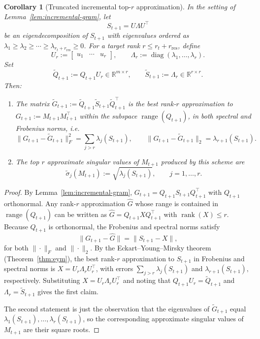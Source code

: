 \documentclass[10pt]{article} %
\newtheorem{corollary}{Corollary}
\begin{document}
\begin{corollary}[Truncated incremental top-$r$ approximation]
\label{cor:incremental-truncated}
In the setting of Lemma~\ref{lem:incremental-gram}, let
\[
  S_{t+1} = U \Lambda U^\top
\]
be an eigendecomposition of $S_{t+1}$ with eigenvalues ordered as
$\lambda_1\ge\lambda_2\ge\cdots\ge\lambda_{r_t + r_{\mathrm{res}}}\ge 0$.
For a target rank $r\le r_t + r_{\mathrm{res}}$, define
\[
  U_r := \begin{bmatrix}u_1 & \cdots & u_r\end{bmatrix},
  \qquad
  \Lambda_r := \operatorname{diag}(\lambda_1,\dots,\lambda_r).
\]
Set
\[
  \widetilde{Q}_{t+1} := Q_{t+1} U_r \in \mathbb{R}^{m\times r},
  \qquad
  \widetilde{S}_{t+1} := \Lambda_r \in \mathbb{R}^{r\times r}.
\]
Then:

\begin{enumerate}
  \item The matrix
  \(
    \widetilde{G}_{t+1} := \widetilde{Q}_{t+1} \widetilde{S}_{t+1} \widetilde{Q}_{t+1}^\top
  \)
  is the best rank-$r$ approximation to
  $G_{t+1} := M_{t+1}M_{t+1}^\top$ within the subspace
  $\operatorname{range}(Q_{t+1})$, in both spectral and Frobenius norms, i.e.
  \[
    \| G_{t+1} - \widetilde{G}_{t+1} \|_F^2
    = \sum_{j>r} \lambda_j(S_{t+1}),
    \qquad
    \| G_{t+1} - \widetilde{G}_{t+1} \|_2
    = \lambda_{r+1}(S_{t+1}).
  \]
  \item The top $r$ approximate singular values of $M_{t+1}$ produced by this
  scheme are
  \[
    \widetilde{\sigma}_j(M_{t+1}) := \sqrt{\lambda_j(S_{t+1})},
    \qquad j=1,\dots,r.
  \]
\end{enumerate}
\end{corollary}

\begin{proof}
By Lemma~\ref{lem:incremental-gram}, $G_{t+1}=Q_{t+1} S_{t+1} Q_{t+1}^\top$ with
$Q_{t+1}$ orthonormal. Any rank-$r$ approximation $\widehat{G}$ whose range is
contained in $\operatorname{range}(Q_{t+1})$ can be written as
$\widehat{G}=Q_{t+1} X Q_{t+1}^\top$ with $\operatorname{rank}(X)\le r$.
Because $Q_{t+1}$ is orthonormal, the Frobenius and spectral norms satisfy
\[
  \|G_{t+1}-\widehat{G}\| = \|S_{t+1}-X\|,
\]
for both $\|\cdot\|_F$ and $\|\cdot\|_2$. By the Eckart--Young--Mirsky
theorem (Theorem~\ref{thm:eym}), the best rank-$r$ approximation to $S_{t+1}$ in Frobenius and
spectral norms is $X = U_r \Lambda_r U_r^\top$, with errors
\(
  \sum_{j>r} \lambda_j(S_{t+1})
\)
and
\(
  \lambda_{r+1}(S_{t+1}),
\)
respectively. Substituting $X = U_r \Lambda_r U_r^\top$ and noting that
$Q_{t+1}U_r = \widetilde{Q}_{t+1}$ and $\Lambda_r = \widetilde{S}_{t+1}$
gives the first claim.

The second statement is just the observation that the eigenvalues of
$\widetilde{G}_{t+1}$ equal $\lambda_1(S_{t+1}),\dots,\lambda_r(S_{t+1})$,
so the corresponding approximate singular values of $M_{t+1}$ are their
square roots.
\end{proof}
\end{document}
